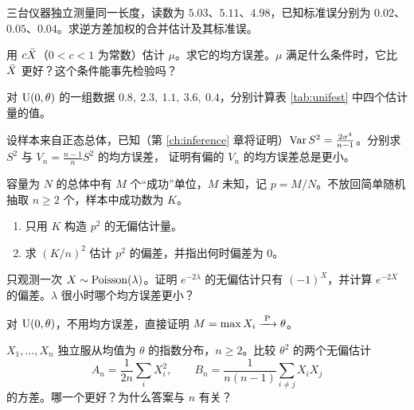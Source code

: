 \begin{exercise}
三台仪器独立测量同一长度，读数为 $5.03$、$5.11$、$4.98$，已知标准误分别为 $0.02$、$0.05$、$0.04$。求逆方差加权的合并估计及其标准误。
\end{exercise}

\begin{exercise}\label{ex2:shrink}
用 $c\bar{X}$（$0<c<1$ 为常数）估计 $\mu$。求它的均方误差。$\mu$ 满足什么条件时，它比 $\bar{X}$ 更好？这个条件能事先检验吗？
\end{exercise}

\begin{exercise}
对 $\operatorname{U}(0,\theta)$ 的一组数据 $0.8,\ 2.3,\ 1.1,\ 3.6,\ 0.4$，分别计算表 \ref{tab:unifest} 中四个估计量的值。
\end{exercise}

\levelB
\begin{exercise}
设样本来自正态总体，已知（第 \ref{ch:inference} 章将证明）$\operatorname{Var} S^2=\frac{2\sigma^4}{n-1}$。分别求 $S^2$ 与 $V_n=\frac{n-1}{n}S^2$ 的均方误差，
证明有偏的 $V_n$ 的均方误差总是更小。
\end{exercise}

\begin{exercise}[原讲义习题 3.3]
容量为 $N$ 的总体中有 $M$ 个“成功”单位，$M$ 未知，记 $p=M/N$。不放回简单随机抽取 $n\ge2$ 个，样本中成功数为 $K$。
\begin{enumerate}
\item 只用 $K$ 构造 $p^2$ 的无偏估计量。
\item 求 $(K/n)^2$ 估计 $p^2$ 的偏差，并指出何时偏差为 $0$。
\end{enumerate}
\end{exercise}

\begin{exercise}
只观测一次 $X\sim\operatorname{Poisson}(\lambda)$。证明 $e^{-2\lambda}$ 的无偏估计只有 $(-1)^X$，并计算 $e^{-2X}$ 的偏差。$\lambda$ 很小时哪个均方误差更小？
\end{exercise}

\begin{exercise}
对 $\operatorname{U}(0,\theta)$，不用均方误差，直接证明 $M=\max X_i\xrightarrow{\;\mathrm{P}\;}\theta$。
\end{exercise}

\levelC
\begin{exercise}[原讲义习题 3.7]
$X_1,\dots,X_n$ 独立服从均值为 $\theta$ 的指数分布，$n\ge2$。比较 $\theta^2$ 的两个无偏估计
\[
A_n=\frac{1}{2n}\sum_iX_i^2,\qquad B_n=\frac{1}{n(n-1)}\sum_{i\ne j}X_iX_j
\]
的方差。哪一个更好？为什么答案与 $n$ 有关？
\end{exercise}

